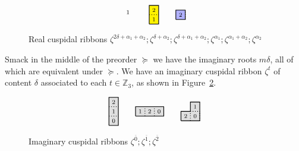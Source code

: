 \documentclass[Unicode,ALCO]{cedram}
\newcommand{\0}{{\bar 0}}
\newcommand{\ZZ}{{\mathbb Z}}
\newcommand{\hackcenter}[1]{
 \xy (0,0)*{#1}; \endxy}
\begin{document}
\begin{exam}
\begin{figure}
\begin{align*}
{\begin{tikzpicture}[scale=0.4]
\node at (0.5,0.5){$\scriptstyle1 $};
\end{tikzpicture}
}
\qquad
\hackcenter{
\begin{tikzpicture}[scale=0.4]
\draw[thick, fill=yellow]  (0,0)--(1,0)--(1,2)--(0,2)--(0,0);
\draw[thick, dotted] (0,1)--(1,1);
\node at (0.5,0.5){$\scriptstyle1 $};
\node at (0.5,1.5){$\scriptstyle2 $};
\end{tikzpicture}
}
\qquad
\hackcenter{
\begin{tikzpicture}[scale=0.4]
\draw[thick, fill=blue!30]  (0,0)--(1,0)--(1,1)--(0,1)--(0,0);
\draw[thick, dotted] (1,0)--(1,1);
\node at (0.5,0.5){$\scriptstyle2 $};
\end{tikzpicture}
}
\end{align*}
\caption{Real cuspidal ribbons \(
\zeta^{2 \delta + \alpha_1 + \alpha_2}; \zeta^{ \delta+\alpha_2}; \zeta^{\delta + \alpha_1 + \alpha_2}; \zeta^{ \alpha_1}; \zeta^{\alpha_1 + \alpha_2}; \zeta^{\alpha_2}
\)}
\label{fig:BigEx2}       
\end{figure}

Smack in the middle of the preorder \(\succeq\) we have the imaginary roots \(m \delta\), all of which are equivalent under \(\succeq\). We have an imaginary cuspidal ribbon \(\zeta^{t}\) of content \(\delta\) associated to each \(t \in \ZZ_3\), as shown in Figure~\ref{fig:BigEx3}. 
\begin{figure}
\begin{align*}
{}
\hackcenter{
\begin{tikzpicture}[scale=0.4]
\draw[thick, fill=lightgray!50]  (0,0)--(1,0)--(1,3)--(0,3)--(0,0);
\draw[thick, dotted] (0,1)--(1,1);
\draw[thick, dotted] (0,2)--(1,2);
\node at (0.5,0.5){$\scriptstyle0 $};
\node at (0.5,1.5){$\scriptstyle1 $};
\node at (0.5,2.5){$\scriptstyle2 $};
\end{tikzpicture}
}
\qquad
\hackcenter{
\begin{tikzpicture}[scale=0.4]
\draw[thick, fill=lightgray!50]  (0,0)--(3,0)--(3,1)--(0,1)--(0,0);
\draw[thick, dotted] (1,0)--(1,1);
\draw[thick, dotted] (2,0)--(2,1);
\node at (0.5,0.5){$\scriptstyle1 $};
\node at (1.5,0.5){$\scriptstyle2 $};
\node at (2.5,0.5){$\scriptstyle0 $};
\end{tikzpicture}
}
\qquad
\hackcenter{
\begin{tikzpicture}[scale=0.4]
\draw[thick, fill=lightgray!50] (0,0)--(2,0)--(2,2)--(1,2)--(1,1)--(0,1)--(0,0);
\draw[thick, dotted] (1,0)--(1,1);
\draw[thick, dotted] (2,0)--(2,1);
\draw[thick, dotted] (1,1)--(2,1);
\node at (0.5,0.5){$\scriptstyle2 $};
\node at (1.5,0.5){$\scriptstyle0 $};
\node at (1.5,1.5){$\scriptstyle1 $};
\end{tikzpicture}
}
\end{align*}
\caption{Imaginary cuspidal ribbons \(
\zeta^{\overline 0}; \zeta^{ \overline 1}; \zeta^{\overline 2}
\)}
\label{fig:BigEx3}     
\end{figure}


\end{exam}
\end{document}
